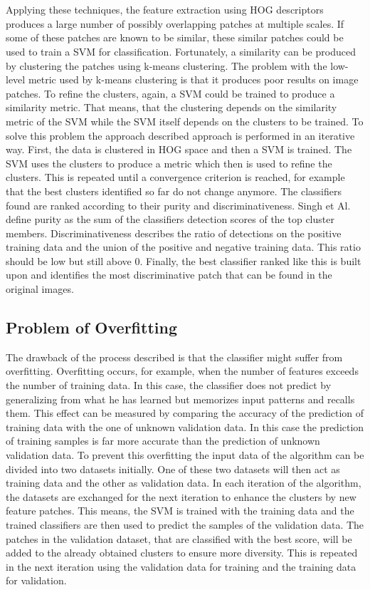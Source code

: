 \\
\\
Applying these techniques, the feature extraction using HOG descriptors produces a large number of possibly overlapping patches at multiple scales. If some of these patches are known to be similar, these similar patches could be used to train a SVM for classification. Fortunately, a similarity can be produced by clustering the patches using k-means clustering. The problem with the low-level metric used by k-means clustering is that it produces poor results on image patches. To refine the clusters, again, a SVM could be trained to produce a similarity metric. That means, that the clustering depends on the similarity metric of the SVM while the SVM itself depends on the clusters to be trained. To solve this problem the approach described approach is performed in an iterative way. First, the data is clustered in HOG space and then a SVM is trained. The SVM uses the clusters to produce a metric which then is used to refine the clusters. This is repeated until a convergence criterion is reached, for example that the best clusters identified so far do not change anymore. The classifiers found are ranked according to their purity and discriminativeness. Singh et Al. \cite{Singh2012DiscPat} define purity as the sum of the classifiers detection scores of the top cluster members. Discriminativeness describes the ratio of detections on the positive training data and the union of the positive and negative training data. This ratio should be low but still above 0. Finally, the best classifier ranked like this is built upon and identifies the most discriminative patch that can be found in the original images.

\subsection{Problem of Overfitting}

The drawback of the process described is that the classifier might suffer from overfitting. Overfitting occurs, for example, when the number of features exceeds the number of training data. In this case, the classifier does not predict by generalizing from what he has learned but memorizes input patterns and recalls them. This effect can be measured by comparing the accuracy of the prediction of training data with the one of unknown validation data. In this case the prediction of training samples is far more accurate than the prediction of unknown validation data. To prevent this overfitting the input data of the algorithm can be divided into two datasets initially. One of these two datasets will then act as training data and the other as validation data. In each iteration of the algorithm, the datasets are exchanged for the next iteration to enhance the clusters by new feature patches. This means, the SVM is trained with the training data and the trained classifiers are then used to predict the samples of the validation data. The patches in the validation dataset, that are classified with the best score, will be added to the already obtained clusters to ensure more diversity. This is repeated in the next iteration using the validation data for training and the training data for validation.

